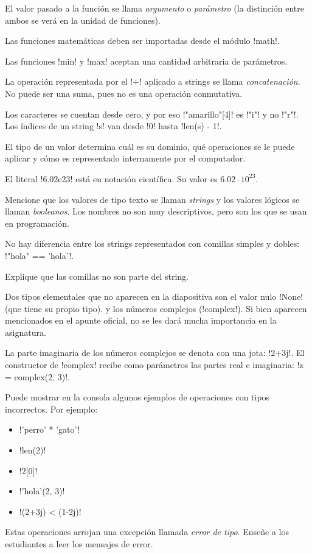 \documentclass[10pt]{article}
\begin{document}
  El valor pasado a la función
  se llama \emph{argumento} o \emph{parámetro}
  (la distinción entre ambos se verá en la unidad de funciones).

  Las funciones matemáticas
  deben ser importadas desde el módulo \li!math!.

  Las funciones \li!min! y \li!max! aceptan
  una cantidad arbitraria de parámetros.


  La operación representada por el \li!+! aplicado a strings
  se llama \emph{concatenación}.
  No puede ser una suma, pues no es una operación conmutativa.

  Los caracteres se cuentan desde cero,
  y por eso \li!"amarillo"[4]! es \li!"i"! y no \li!"r"!.
  Los índices de un string \li!s! van desde \li!0!
  hasta \li!len(s) - 1!.


  El tipo de un valor
  determina cuál es su dominio,
  qué operaciones se le puede aplicar
  y cómo es representado internamente por el computador.

  El literal \li!6.02e23! está en notación científica.
  Su valor es \(6.02\cdot 10^{23}\).

  Mencione que los valores de tipo texto se llaman \emph{strings}
  y los valores lógicos se llaman \emph{booleanos}.
  Los nombres no son muy descriptivos,
  pero son los que se usan en programación.

  No hay diferencia entre los strings
  representados con comillas simples y dobles:
  \li!"hola" == 'hola'!.

  Explique que las comillas no son parte del string.

  Dos tipos elementales que no aparecen en la diapositiva
  son el valor nulo \li!None! (que tiene su propio tipo).
  y los números complejos (\li!complex!).
  Si bien aparecen mencionados en el apunte oficial,
  no se les dará mucha importancia en la asignatura.

  La parte imaginaria de los números complejos
  se denota con una jota: \li!2+3j!.
  El constructor de \li!complex!
  recibe como parámetros las partes real e imaginaria:
  \li!z = complex(2, 3)!.

  Puede mostrar en la consola algunos ejemplos
  de operaciones con tipos incorrectos.
  Por ejemplo:
  \begin{itemize}
    \item \li!'perro' * 'gato'!
    \item \li!len(2)!
    \item \li!2[0]!
    \item \li!'hola'(2, 3)!
    \item \li!(2+3j) < (1-2j)!
  \end{itemize}
  Estas operaciones arrojan una excepción
  llamada \emph{error de tipo}.
  Enseñe a los estudiantes a leer los mensajes de error.
\end{document}
